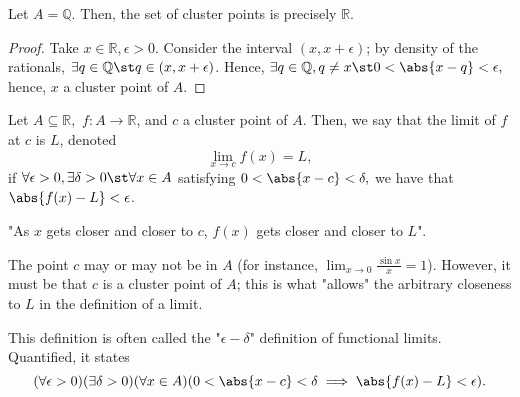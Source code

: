 \documentclass[12pt]{article}
\begin{document}
\begin{example}
Let $A = \mathbb{Q}$. Then, the set of cluster points is precisely $\mathbb{R}$.

\begin{proof}
  Take $x \in \mathbb{R}, \epsilon > 0$. Consider the interval $(x, x + \epsilon)$; by density of the rationals, $\exists q \in \mathbb{Q} \st q \in (x, x + \epsilon)$. Hence, $\exists q \in \mathbb{Q}, q \neq x \st 0 < \abs{x - q} < \epsilon,$ hence, $x$ a cluster point of $A$.
\end{proof}
\end{example}

\begin{definition}
  Let $A \subseteq \mathbb{R},$ $f : A \to \mathbb{R}$, and $c$ a cluster point of $A$. Then, we say that the limit of $f$ at $c$ is $L$, denoted \[\lim_{x \to c} f(x) = L,\] if $\forall \epsilon > 0, \exists \delta > 0 \st \forall x \in A$ satisfying $0 < \abs{x - c} < \delta,$ we have that $\abs{f(x) - L} < \epsilon$.
\end{definition}

\begin{remark}
  "As $x$ gets closer and closer to $c$, $f(x)$ gets closer and closer to $L$".
\end{remark}

\begin{remark}
  The point $c$ may or may not be in $A$ (for instance, $\lim_{x \to 0} \frac{\sin x}{x} = 1$). However, it must be that $c$ is a cluster point of $A$; this is what "allows" the arbitrary closeness to $L$ in the definition of a limit.
\end{remark}

\begin{remark}
  This definition is often called the "$\epsilon-\delta$" definition of functional limits. Quantified, it states \[
  (\forall \epsilon > 0)(\exists \delta > 0)(\forall x \in A)(0 < \abs{x - c} < \delta\implies \abs{f(x) - L} < \epsilon).  
  \]
\end{remark}
\end{document}
